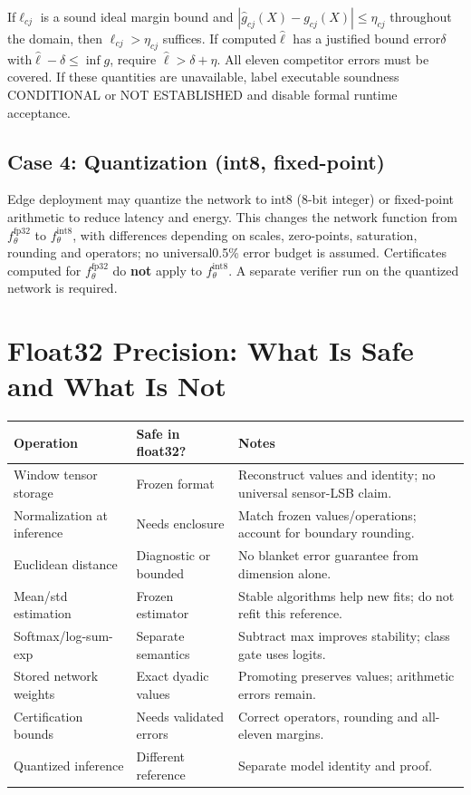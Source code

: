\documentclass[11pt, a4paper]{article}
\theoremstyle{definition}
\theoremstyle{plain}
\begin{document}
If$\ell_{cj}$ is a sound ideal margin bound and
$|\widehat g_{cj}(X)-g_{cj}(X)|\le\eta_{cj}$ throughout the domain, then
$\ell_{cj}>\eta_{cj}$ suffices. If computed$\widehat\ell$ has a justified
bound error$\delta$ with$\widehat\ell-\delta\le\inf g$, require
$\widehat\ell>\delta+\eta$. All eleven competitor errors must be covered.
If these quantities are unavailable, label executable soundness CONDITIONAL
or NOT ESTABLISHED and disable formal runtime acceptance.

\subsection{Case 4: Quantization (int8, fixed-point)}

Edge deployment may quantize the network to int8 (8-bit integer) or fixed-point
arithmetic to reduce latency and energy. This changes the network function from
$f_\theta^{\text{fp32}}$ to $f_\theta^{\text{int8}}$, with differences depending on scales, zero-points, saturation, rounding and operators; no universal0.5\% error budget is assumed. Certificates computed for
$f_\theta^{\text{fp32}}$ do \textbf{not} apply to $f_\theta^{\text{int8}}$.
A separate verifier run on the quantized network is required.

\section{Float32 Precision: What Is Safe and What Is Not}

\begin{center}
\small
\begin{tabularx}{\linewidth}{@{}lYY@{}}
\toprule
Operation & Safe in float32? & Notes \\
\midrule
Window tensor storage & Frozen format & Reconstruct values and identity; no universal sensor-LSB claim. \\
Normalization at inference & Needs enclosure & Match frozen values/operations; account for boundary rounding. \\
Euclidean distance & Diagnostic or bounded & No blanket error guarantee from dimension alone. \\
Mean/std estimation & Frozen estimator & Stable algorithms help new fits; do not refit this reference. \\
Softmax/log-sum-exp & Separate semantics & Subtract max improves stability; class gate uses logits. \\
Stored network weights & Exact dyadic values & Promoting preserves values; arithmetic errors remain. \\
Certification bounds & Needs validated errors & Correct operators, rounding and all-eleven margins. \\
Quantized inference & Different reference & Separate model identity and proof. \\
\bottomrule
\end{tabularx}
\end{center}
\end{document}
